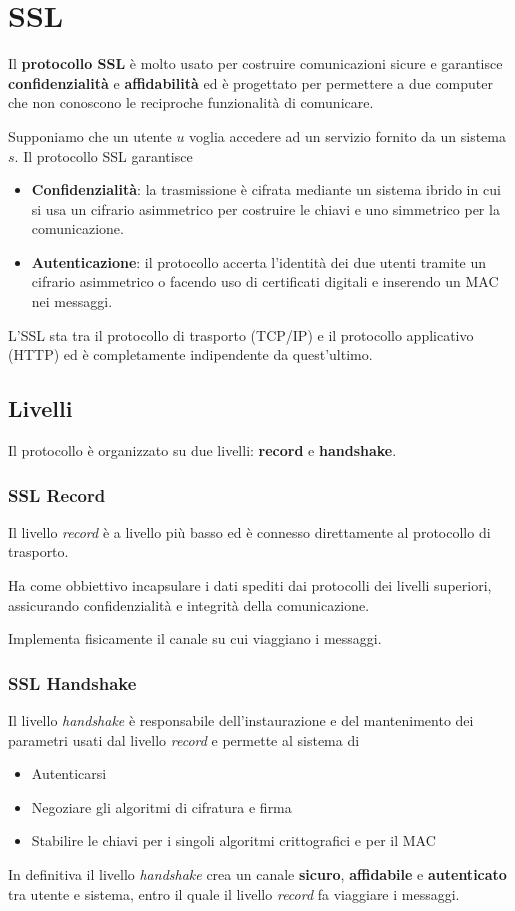 \section{SSL}
Il \textbf{protocollo SSL} \`e molto usato per costruire comunicazioni sicure e garantisce \textbf{confidenzialit\`a}
e \textbf{affidabilit\`a} ed \`e progettato per permettere a due computer che non conoscono le reciproche
funzionalit\`a di comunicare.

Supponiamo che un utente $u$ voglia accedere ad un servizio fornito da un sistema $s$. Il protocollo SSL garantisce
\begin{itemize}
	\item \textbf{Confidenzialit\`a}: la trasmissione \`e cifrata mediante un sistema ibrido in cui si usa un
	      cifrario asimmetrico per costruire le chiavi e uno simmetrico per la comunicazione.
	\item \textbf{Autenticazione}: il protocollo accerta l'identit\`a dei due utenti tramite un cifrario asimmetrico
	      o facendo uso di certificati digitali e inserendo un MAC nei messaggi.
\end{itemize}
L'SSL sta tra il protocollo di trasporto (TCP/IP) e il protocollo applicativo (HTTP) ed \`e completamente
indipendente da quest'ultimo.

\subsection{Livelli}
Il protocollo \`e organizzato su due livelli: \textbf{record} e \textbf{handshake}.

\subsubsection{SSL Record}
Il livello \emph{record} \`e a livello pi\`u basso ed \`e connesso direttamente al protocollo di trasporto.

Ha come obbiettivo incapsulare i dati spediti dai protocolli dei livelli superiori, assicurando confidenzialit\`a
e integrit\`a della comunicazione.

Implementa fisicamente il canale su cui viaggiano i messaggi.

\subsubsection{SSL Handshake}
Il livello \emph{handshake} \`e responsabile dell'instaurazione e del mantenimento dei parametri usati dal livello
\emph{record} e permette al sistema di
\begin{itemize}
	\item Autenticarsi
	\item Negoziare gli algoritmi di cifratura e firma
	\item Stabilire le chiavi per i singoli algoritmi crittografici e per il MAC
\end{itemize}
In definitiva il livello \emph{handshake} crea un canale \textbf{sicuro}, \textbf{affidabile} e \textbf{autenticato}
tra utente e sistema, entro il quale il livello \emph{record} fa viaggiare i messaggi.

